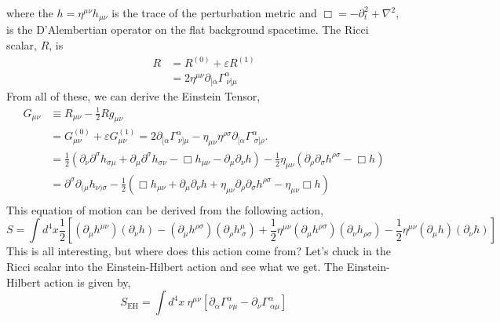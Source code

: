 where the $h = \eta^{\mu\nu}h_{\mu\nu}$ is the trace of the perturbation metric and $\Box = - \partial_{t}^2 + \nabla^2$, is the D'Alembertian operator on the flat background spacetime. The Ricci scalar, $R$, is
\begin{equation}
    \begin{split}
    R &= R^{(0)} + \varepsilon R^{(1)}\\
&=2\eta^{\mu\nu}\partial_{[\alpha}\Gamma^{\alpha}_{\ \nu]\mu}
    \end{split}
\end{equation}
From all of these, we can derive the Einstein Tensor, 
\begin{equation}
\begin{split}
    G_{\mu\nu} &\equiv R_{\mu\nu} - \frac{1}{2}R g_{\mu\nu}\\
    &=G^{(0)}_{\mu\nu} + \varepsilon G^{(1)}_{\mu\nu}=2\partial_{[\alpha}\Gamma^{\alpha}_{\ \nu]\mu} - \eta_{\mu\nu}\eta^{\rho\sigma}\partial_{[\alpha}\Gamma^{\alpha}_{\ \sigma]\rho}.\\
&=\frac{1}{2}\left(\partial_{\nu}\partial^{\sigma}h_{\sigma\mu} + \partial_{\mu}\partial^{\sigma}h_{\sigma\nu} - \Box h_{\mu\nu} - \partial_{\mu}\partial_{\nu}h\right) - \frac{1}{2}\eta_{\mu\nu}\left(\partial_{\rho}\partial_{\sigma}h^{\rho\sigma} - \Box h\right)\\
&=\partial^{\sigma}\partial_{(\mu}h_{\nu)\sigma} - \frac{1}{2}\left(\Box h_{\mu\nu} + \partial_{\mu}\partial_{\nu}h + \eta_{\mu\nu}\partial_{\rho}\partial_{\sigma}h^{\rho\sigma} - \eta_{\mu\nu}\Box h \right) \\
\end{split}
\end{equation}
This equation of motion can be derived from the following action, 
\begin{equation}
    S = \int d^4x\frac{1}{2}\left[(\partial_{\mu}h^{\mu\nu})(\partial_{\nu}h) - (\partial_{\mu}h^{\rho\sigma})(\partial_{\rho}h^{\mu}_{\ \sigma}) + \frac{1}{2}\eta^{\mu\nu}(\partial_{\mu}h^{\rho\sigma})(\partial_{\nu}h_{\rho\sigma}) - \frac{1}{2}\eta^{\mu\nu}(\partial_{\mu}h)(\partial_{\nu}h)\right]
\end{equation}
This is all interesting, but where does this action come from? Let's chuck in the Ricci scalar into the Einstein-Hilbert action and see what we get. The Einstein-Hilbert action is given by, 
\begin{equation}
    S_{\text{EH}} = \int d^4x \ \eta^{\mu\nu} \left[\partial_{\alpha}\Gamma^{\alpha}_{\ \nu\mu} - \partial_{\nu}\Gamma^{\alpha}_{\ \alpha\mu}\right]
\end{equation}

